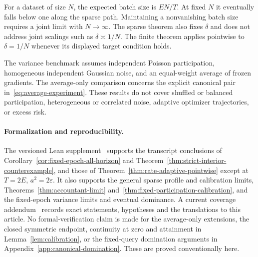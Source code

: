 \documentclass[11pt]{article}
\theoremstyle{remark}
\begin{document}
For a dataset of size $N$, the expected batch size is $EN/T$. At fixed $N$
it eventually falls below one along the sparse path. Maintaining a
nonvanishing batch size requires a joint limit with $N\to\infty$. The sparse
theorem also fixes $\delta$ and does not address joint scalings such as
$\delta\asymp1/N$. The finite theorem applies pointwise to $\delta=1/N$
whenever its displayed target condition holds.

The variance benchmark assumes independent Poisson participation,
homogeneous independent Gaussian noise, and an equal-weight average of
frozen gradients. The average-only comparison concerns the explicit
canonical pair in~\eqref{eq:average-experiment}. These results do not cover
shuffled or balanced participation, heterogeneous or correlated noise,
adaptive optimizer trajectories, or excess risk.

\paragraph{Formalization and reproducibility.}
The versioned Lean supplement~\cite{rational-supplement} supports the
transcript conclusions of Corollary~\ref{cor:fixed-epoch-all-horizon} and
Theorem~\ref{thm:strict-interior-counterexample}, and those of
Theorem~\ref{thm:rate-adaptive-pointwise} except at $T=2E$,
$a^2=2\varepsilon$. It also supports the general sparse profile and
calibration limits, Theorems~\ref{thm:accountant-limit}
and~\ref{thm:fixed-participation-calibration}, and the fixed-epoch variance
limits and eventual dominance. A current coverage addendum~\cite{formal-coverage}
records exact statements, hypotheses and the translations to this article.
No formal-verification claim is made for the average-only extensions, the
closed symmetric endpoint, continuity at zero and attainment in
Lemma~\ref{lem:calibration}, or the fixed-query domination arguments in
Appendix~\ref{app:canonical-domination}. These are proved conventionally here.

\clearpage
\appendix
\end{document}
